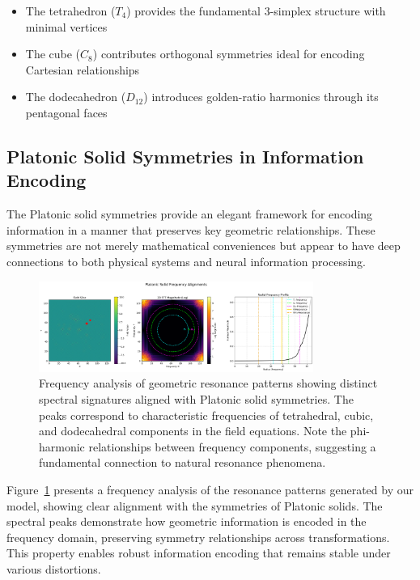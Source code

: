 \documentclass[12pt,letterpaper]{article}
\begin{document}
\begin{itemize}
    \item The tetrahedron ($T_4$) provides the fundamental 3-simplex structure with minimal vertices
    \item The cube ($C_8$) contributes orthogonal symmetries ideal for encoding Cartesian relationships
    \item The dodecahedron ($D_{12}$) introduces golden-ratio harmonics through its pentagonal faces
\end{itemize}

\vspace{2mm}
\subsection{Platonic Solid Symmetries in Information Encoding}
\label{subsec:platonic_symmetries}

The Platonic solid symmetries provide an elegant framework for encoding information in a manner that preserves key geometric relationships. These symmetries are not merely mathematical conveniences but appear to have deep connections to both physical systems and neural information processing.

\begin{figure}[H]
    \centering
    \includegraphics[width=0.8\textwidth,height=0.3\textheight,keepaspectratio]{figures/platonic_frequencies_fixed.png}
    \caption{Frequency analysis of geometric resonance patterns showing distinct spectral signatures aligned with Platonic solid symmetries. The peaks correspond to characteristic frequencies of tetrahedral, cubic, and dodecahedral components in the field equations. Note the phi-harmonic relationships between frequency components, suggesting a fundamental connection to natural resonance phenomena.}
    \label{fig:frequencies}
\end{figure}

Figure~\ref{fig:frequencies} presents a frequency analysis of the resonance patterns generated by our model, showing clear alignment with the symmetries of Platonic solids. The spectral peaks demonstrate how geometric information is encoded in the frequency domain, preserving symmetry relationships across transformations. This property enables robust information encoding that remains stable under various distortions.
\end{document}
